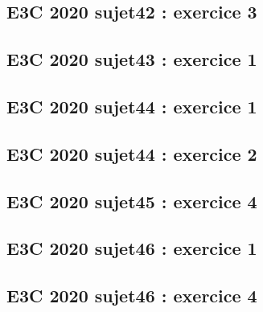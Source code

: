 \documentclass[lang=fr,edition=teacher,layout=sheet]{mxbook}
\begin{document}
\begingroup\endgroup
\par\bigskip
{}\subsection*{E3C 2020 sujet42 : exercice 3}
\begingroup\endgroup
\par\bigskip
{}\subsection*{E3C 2020 sujet43 : exercice 1}
\begingroup\endgroup
\par\bigskip
{}\subsection*{E3C 2020 sujet44 : exercice 1}
\begingroup\endgroup
\par\bigskip
{}\subsection*{E3C 2020 sujet44 : exercice 2}
\begingroup\endgroup
\par\bigskip
{}\subsection*{E3C 2020 sujet45 : exercice 4}
\begingroup\endgroup
\par\bigskip
{}\subsection*{E3C 2020 sujet46 : exercice 1}
\begingroup\endgroup
\par\bigskip
{}\subsection*{E3C 2020 sujet46 : exercice 4}
\end{document}
